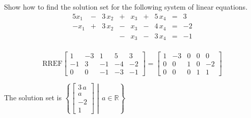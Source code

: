 
\begin{exerciseStatement}


Show how to find the solution set for the following system of linear equations. 
\begin{alignat*}{5} x_{1} &-& 3 \, x_{2} &+& x_{3} &+& 5 \, x_{4} &=& 3 \\-x_{1} &+& 3 \, x_{2} &-& x_{3} &-& 4 \, x_{4} &=& -2 \\ & &  &-& x_{3} &-& 3 \, x_{4} &=& -1 \\ \end{alignat*}
            


\end{exerciseStatement}
    
\begin{exerciseAnswer} 
\[\mathrm{RREF} \left[\begin{array}{cccc|c}
1 & -3 & 1 & 5 & 3 \\
-1 & 3 & -1 & -4 & -2 \\
0 & 0 & -1 & -3 & -1
\end{array}\right]  =  \left[\begin{array}{cccc|c}
1 & -3 & 0 & 0 & 0 \\
0 & 0 & 1 & 0 & -2 \\
0 & 0 & 0 & 1 & 1
\end{array}\right] \]

The solution set is \( \left\{ \left[\begin{array}{c}
3 \, a \\
a \\
-2 \\
1
\end{array}\right] \middle|\,a\in\mathbb{R}\right\} \)


\end{exerciseAnswer}
    
